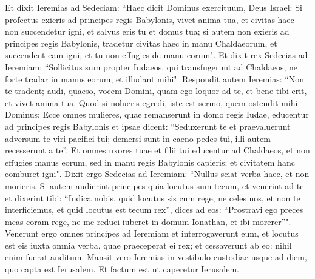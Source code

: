 \begin{biblechapter}
\verse Et dixit Ieremias ad Sedeciam: “Haec dicit Dominus exercituum, Deus Israel: Si profectus exieris ad principes regis Babylonis, vivet anima tua, et civitas haec non succendetur igni, et salvus eris tu et domus tua; 
\verse si autem non exieris ad principes regis Babylonis, tradetur civitas haec in manu Chaldaeorum, et succendent eam igni, et tu non effugies de manu eorum". 
\verse Et dixit rex Sedecias ad Ieremiam: “Sollicitus sum propter Iudaeos, qui transfugerunt ad Chaldaeos, ne forte tradar in manus eorum, et illudant mihi". 
\verse Respondit autem Ieremias: “Non te tradent; audi, quaeso, vocem Domini, quam ego loquor ad te, et bene tibi erit, et vivet anima tua. 
\verse Quod si nolueris egredi, iste est sermo, quem ostendit mihi Dominus: 
\verse Ecce omnes mulieres, quae remanserunt in domo regis Iudae, educentur ad principes regis Babylonis et ipsae dicent: “Seduxerunt te et praevaluerunt adversum te viri pacifici tui; demersi sunt in caeno pedes tui, illi autem recesserunt a te”. 
\verse Et omnes uxores tuae et filii tui educentur ad Chaldaeos, et non effugies manus eorum, sed in manu regis Babylonis capieris; et civitatem hanc comburet igni". 
\verse Dixit ergo Sedecias ad Ieremiam: “Nullus sciat verba haec, et non morieris.  
\verse Si autem audierint principes quia locutus sum tecum, et venerint ad te et dixerint tibi: “Indica nobis, quid locutus sis cum rege, ne celes nos, et non te interficiemus, et quid locutus est tecum rex”, 
\verse dices ad eos: “Prostravi ego preces meas coram rege, ne me reduci iuberet in domum Ionathan, et ibi morerer”". 
\verse Venerunt ergo omnes principes ad Ieremiam et interrogaverunt eum, et locutus est eis iuxta omnia verba, quae praeceperat ei rex; et cessaverunt ab eo: nihil enim fuerat auditum. 
\verse Mansit vero Ieremias in vestibulo custodiae usque ad diem, quo capta est Ierusalem. Et factum est ut caperetur Ierusalem. 
\end{biblechapter}

